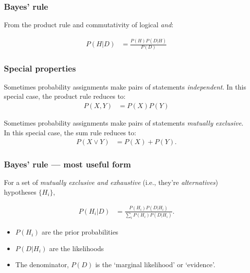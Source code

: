 \documentclass{beamer}
\begin{document}
\begin{frame}
\frametitle{Bayes' rule}

From the product rule and commutativity of logical {\em and}:

\begin{align}
P(H|D) &= \frac{P(H)P(D|H)}{P(D)}
\end{align}

\end{frame}


\begin{frame}
\frametitle{Special properties}
Sometimes probability assignments make pairs of statements
{\em independent}. In this special case, the product rule reduces to:
\begin{align}
P(X,Y) &= P(X)P(Y)
\end{align}

Sometimes probability assignments make pairs of statements
{\em mutually exclusive}. In this special case, the sum rule reduces to:
\begin{align}
P(X \vee Y) &= P(X) + P(Y).
\end{align}

\end{frame}

\begin{frame}
\frametitle{Bayes' rule --- most useful form}
For a set of {\em mutually exclusive and exhaustive} (i.e., they're
{\em alternatives}) hypotheses $\{H_i\}$,

\begin{align}
P(H_i|D) &= \frac{P(H_i)P(D|H_i)}{\sum_i P(H_i)P(D|H_i)}.
\end{align}

\begin{itemize}
\item $P(H_i)$ are the prior probabilities
\item $P(D|H_i)$ are the likelihoods
\item The denominator, $P(D)$ is the `marginal likelihood' or `evidence'.
\end{itemize}

\end{frame}
\end{document}
